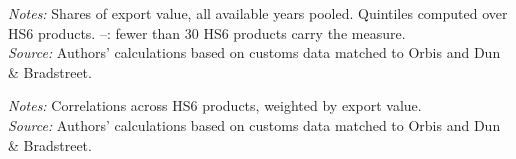 \documentclass[11pt,a4paper]{article}
\begin{document}
\begin{table}[H]\centering\small%
  \caption{Multinational Share of Export Value, by Quintile of Six Sophistication Measures}%
  \label{tab:six_t_all}%
  \par\vspace{3pt}%
  \begin{minipage}{0.95\textwidth}\footnotesize %
  \textit{Notes:} Shares of export value, all available years pooled. Quintiles computed over HS6 products. --: fewer than 30 HS6 products carry the measure.\\[3pt]%
  \textit{Source:} Authors' calculations based on customs data matched to Orbis and Dun \& Bradstreet.%
  \end{minipage}%
  \end{table}
\begin{table}[H]\centering\small%
  \caption{Correlations between Sophistication Measures}%
  \label{tab:corr_all}%
  \par\vspace{3pt}%
  \begin{minipage}{0.95\textwidth}\footnotesize %
  \textit{Notes:} Correlations across HS6 products, weighted by export value.\\[3pt]%
  \textit{Source:} Authors' calculations based on customs data matched to Orbis and Dun \& Bradstreet.%
  \end{minipage}%
  \end{table}
\end{document}
